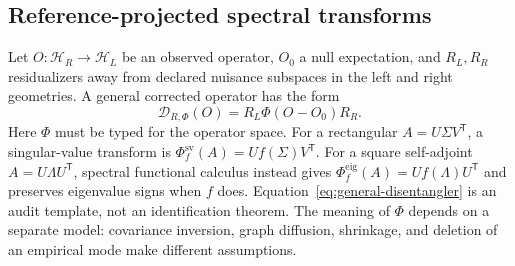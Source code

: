 \documentclass[10pt]{article}
\theoremstyle{definition}
\theoremstyle{remark}
\newcommand{\BookInsert}[1]{}
\newcommand{\BookOnlyChapter}[1]{}
\newcommand{\BookChapterLabel}[1]{}
\newcommand{\BookSpectralSection}[1]{\subsection{#1}}
\newcommand{\BookSpectralMarker}{\label{sec:article-estimation-spectra}}
\begin{document}
\BookInsert{chapters/09_new_coordinates_old_engines}

\BookInsert{chapters/08_coda}
\BookOnlyChapter{Three AlphaFolds: The Evolution of Relational State}
\BookChapterLabel{chap:book-alphafold}
\BookInsert{chapters/08_three_alphafolds}
\BookInsert{chapters/appendix_diffusion_probability_transport}
\BookInsert{chapters/08_msa_pairformer_case}
\BookInsert{chapters/appendix_msa_pairformer_math}
\BookOnlyChapter{Spectra After the Graph Has Been Declared}
\BookSpectralMarker
\BookInsert{chapters/09_opening}
\BookInsert{chapters/10_spectral_primer}
\BookInsert{chapters/11_spectral_decision_primer}
\BookSpectralSection{Reference-projected spectral transforms}

Let $O:\mathcal H_R\to\mathcal H_L$ be an observed operator, $O_0$ a null expectation, and
$R_L,R_R$ residualizers away from declared nuisance subspaces in the left and right geometries.  A
general corrected operator has the form
\begin{equation}
\boxed{
\mathcal D_{R,\Phi}(O)=R_L\Phi(O-O_0)R_R.}
\label{eq:general-disentangler}
\end{equation}
Here $\Phi$ must be typed for the operator space.  For a rectangular
$A=U\Sigma V^{\mathsf T}$, a singular-value transform is
$\Phi_f^{\mathrm{sv}}(A)=Uf(\Sigma)V^{\mathsf T}$.  For a square self-adjoint
$A=U\Lambda U^{\mathsf T}$, spectral functional calculus instead gives
$\Phi_f^{\mathrm{eig}}(A)=Uf(\Lambda)U^{\mathsf T}$ and preserves eigenvalue signs when $f$ does.
Equation~\ref{eq:general-disentangler} is an audit template, not an identification theorem.  The
meaning of $\Phi$ depends on a separate model: covariance inversion, graph diffusion, shrinkage,
and deletion of an empirical mode make different assumptions.
\end{document}
